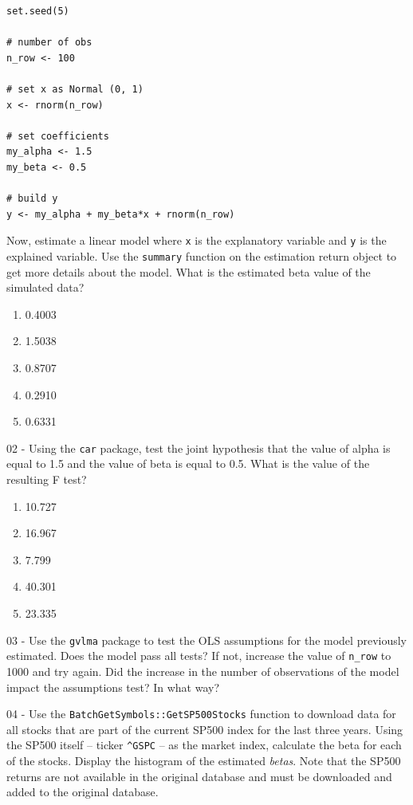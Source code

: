 \documentclass[
  12pt,
]{book}
\providecommand{\tightlist}{%
  \setlength{\itemsep}{0pt}\setlength{\parskip}{0pt}}
\begin{document}
\begin{verbatim}
set.seed(5)

# number of obs
n_row <- 100

# set x as Normal (0, 1)
x <- rnorm(n_row)

# set coefficients
my_alpha <- 1.5
my_beta <- 0.5

# build y
y <- my_alpha + my_beta*x + rnorm(n_row)
\end{verbatim}

Now, estimate a linear model where \texttt{x} is the explanatory variable and \texttt{y} is the explained variable. Use the \texttt{summary} function on the estimation return object to get more details about the model. What is the estimated beta value of the simulated data?

\begin{enumerate}
\def\labelenumi{\alph{enumi})}
\tightlist
\item
  0.4003
\item
  1.5038
\item
  0.8707
\item
  0.2910
\item
  0.6331
\end{enumerate}

02 -
Using the \texttt{car} package, test the joint hypothesis that the value of alpha is equal to 1.5 and the value of beta is equal to 0.5. What is the value of the resulting F test?

\begin{enumerate}
\def\labelenumi{\alph{enumi})}
\tightlist
\item
  10.727
\item
  16.967
\item
  7.799
\item
  40.301
\item
  23.335
\end{enumerate}

03 -
Use the \texttt{gvlma} package to test the OLS assumptions for the model previously estimated. Does the model pass all tests? If not, increase the value of \texttt{n\_row} to 1000 and try again. Did the increase in the number of observations of the model impact the assumptions test? In what way?

04 -
Use the \texttt{BatchGetSymbols::GetSP500Stocks} function to download data for all stocks that are part of the current SP500 index for the last three years. Using the SP500 itself -- ticker \texttt{\textquotesingle{}\^{}GSPC\textquotesingle{}} -- as the market index, calculate the beta for each of the stocks. Display the histogram of the estimated \emph{betas}. Note that the SP500 returns are not available in the original database and must be downloaded and added to the original database.
\end{document}

